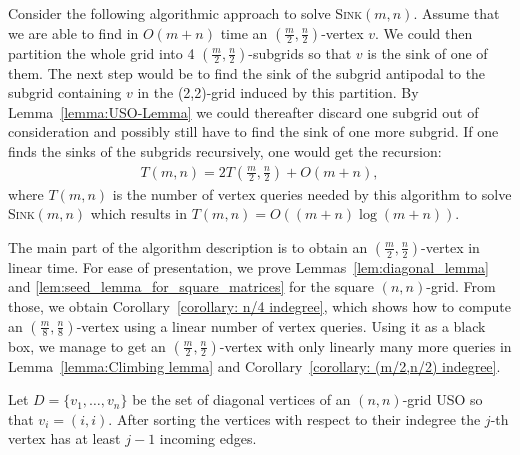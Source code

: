 \documentclass[runningheads,a4paper]{llncs}
\newcommand{\sinkmn}{\textsc{Sink}$(m,n)$\xspace}
\begin{document}
Consider the following algorithmic approach to solve \sinkmn.
Assume that we are able to find in $O(m+n)$ time an $(\frac{m}{2}, \frac{n}{2})$-vertex $v$.
We could then partition the whole grid into 4 $(\frac{m}{2}, \frac{n}{2})$-subgrids so that $v$ is the sink of one of them.
The next step would be to find the sink of the subgrid antipodal to the subgrid containing $v$ in the (2,2)-grid induced by this partition. 
By Lemma~\ref{lemma:USO-Lemma} we could thereafter discard one subgrid out of consideration and possibly still have to find the sink of one more subgrid.
If one finds the sinks of the subgrids recursively, one would get the recursion:
\begin{align*}
 T(m,n) = 2T\left(\frac{m}{2},\frac{n}{2}\right) + O(m+n),
\end{align*}
where $T(m,n)$ is the number of vertex queries needed by this algorithm 
to solve \sinkmn which results in \mbox{$T(m,n) = O((m+n)\log (m+n))$}. 

The main part of the algorithm description is to obtain an $(\frac{m}{2}, \frac{n}{2})$-vertex in linear time.
For ease of presentation, we prove Lemmas~\ref{lem:diagonal_lemma} and \ref{lem:seed_lemma_for_square_matrices} for the square $(n, n)$-grid. From those, 
we obtain Corollary~\ref{corollary: n/4 indegree}, which shows how to compute an 
$(\frac{m}{8}, \frac{n}{8})$-vertex using a linear number of vertex queries. 
Using it as a black box, we manage to get an $(\frac{m}{2}, \frac{n}{2})$-vertex with only linearly 
many more queries in Lemma~\ref{lemma:Climbing lemma} and Corollary~\ref{corollary: (m/2,n/2) indegree}.

\begin{lemma}
\label{lem:diagonal_lemma}
Let $D = \{v_1,\ldots,v_n\}$ be the set of diagonal vertices of an $(n,n)$-grid USO so that $v_i = (i,i)$. After sorting the vertices with respect to their indegree the $j$-th vertex has at least $j-1$ incoming edges.
\end{lemma}
\end{document}

